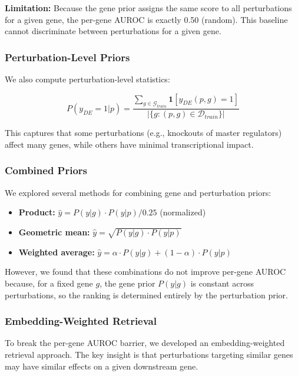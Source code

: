 \documentclass[11pt]{article}
\begin{document}
\textbf{Limitation:} Because the gene prior assigns the same score to all perturbations for a given gene, the per-gene AUROC is exactly 0.50 (random). This baseline cannot discriminate between perturbations for a given gene.

\subsubsection{Perturbation-Level Priors}

We also compute perturbation-level statistics:

\begin{equation}
P(y_{DE} = 1 | p) = \frac{\sum_{g \in \mathcal{G}_{train}} \mathbf{1}[y_{DE}(p, g) = 1]}{|\{g : (p, g) \in \mathcal{D}_{train}\}|}
\end{equation}

This captures that some perturbations (e.g., knockouts of master regulators) affect many genes, while others have minimal transcriptional impact.

\subsubsection{Combined Priors}

We explored several methods for combining gene and perturbation priors:

\begin{itemize}
    \item \textbf{Product:} $\hat{y} = P(y|g) \cdot P(y|p) / 0.25$ (normalized)
    \item \textbf{Geometric mean:} $\hat{y} = \sqrt{P(y|g) \cdot P(y|p)}$
    \item \textbf{Weighted average:} $\hat{y} = \alpha \cdot P(y|g) + (1-\alpha) \cdot P(y|p)$
\end{itemize}

However, we found that these combinations do not improve per-gene AUROC because, for a fixed gene $g$, the gene prior $P(y|g)$ is constant across perturbations, so the ranking is determined entirely by the perturbation prior.

\subsubsection{Embedding-Weighted Retrieval}

To break the per-gene AUROC barrier, we developed an embedding-weighted retrieval approach. The key insight is that perturbations targeting similar genes may have similar effects on a given downstream gene.
\end{document}

